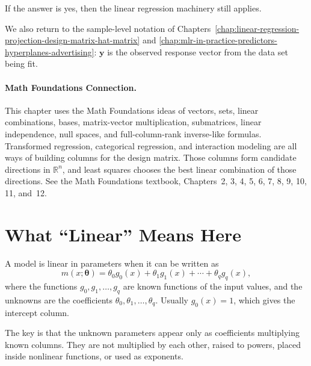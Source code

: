 If the answer is yes, then the linear regression machinery still applies.

We also return to the sample-level notation of Chapters~\ref{chap:linear-regression-projection-design-matrix-hat-matrix} and \ref{chap:mlr-in-practice-predictors-hyperplanes-advertising}: \(\mathbf{y}\) is the observed response vector from the data set being fit.

\paragraph{Math Foundations Connection.}
This chapter uses the Math Foundations ideas of vectors, sets, linear combinations, bases, matrix-vector multiplication, submatrices, linear independence, null spaces, and full-column-rank inverse-like formulas.  Transformed regression, categorical regression, and interaction modeling are all ways of building columns for the design matrix.  Those columns form candidate directions in \(\mathbb{R}^n\), and least squares chooses the best linear combination of those directions.  See the Math Foundations textbook, Chapters~2, 3, 4, 5, 6, 7, 8, 9, 10, 11, and~12.

\section{What ``Linear'' Means Here}

A model is linear in parameters when it can be written as
\begin{equation}
  m(x;\boldsymbol{\theta})
  =\theta_0 g_0(x)+\theta_1 g_1(x)+\cdots+\theta_q g_q(x),
  \label{eq:ch11-linear-in-parameters}
\end{equation}
where the functions \(g_0,g_1,\ldots,g_q\) are known functions of the input values, and the unknowns are the coefficients \(\theta_0,\theta_1,\ldots,\theta_q\).  Usually \(g_0(x)=1\), which gives the intercept column.

The key is that the unknown parameters appear only as coefficients multiplying known columns.  They are not multiplied by each other, raised to powers, placed inside nonlinear functions, or used as exponents.

